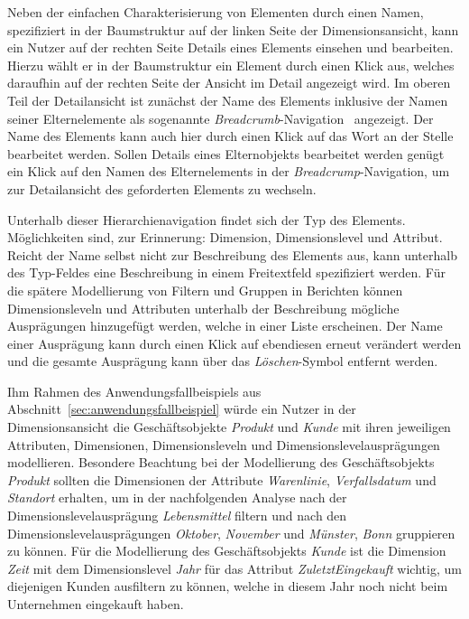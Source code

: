 \documentclass[
  language=german, %
  type=bachelor,%
  ngerman
]{isthesis}
\begin{document}
\begin{content}
  Neben der einfachen Charakterisierung von Elementen durch einen Namen,
  spezifiziert in der Baumstruktur auf der linken Seite der Dimensionsansicht,
  kann ein Nutzer auf der rechten Seite Details eines Elements einsehen und
  bearbeiten.  Hierzu wählt er in der Baumstruktur ein Element durch einen
  Klick aus, welches daraufhin auf der rechten Seite der Ansicht im Detail
  angezeigt wird. Im oberen Teil der Detailansicht ist zunächst der Name des
  Elements inklusive der Namen seiner Elternelemente als sogenannte
  \textit{Breadcrumb}-Navigation~\cite[][S. 1316]{maldonado2002common}
  angezeigt.  Der Name des Elements kann auch hier durch einen Klick auf das
  Wort an der Stelle bearbeitet werden. Sollen Details eines Elternobjekts
  bearbeitet werden genügt ein Klick auf den Namen des Elternelements in der
  \textit{Breadcrump}-Navigation, um zur Detailansicht des geforderten Elements
  zu wechseln. 

  Unterhalb dieser Hierarchienavigation findet sich der Typ des Elements.
  Möglichkeiten sind, zur Erinnerung: Dimension, Dimensionslevel und Attribut.
  Reicht der Name selbst nicht zur Beschreibung des Elements aus, kann
  unterhalb des Typ-Feldes eine Beschreibung in einem Freitextfeld spezifiziert
  werden. Für die spätere Modellierung von Filtern und Gruppen in Berichten
  können Dimensionsleveln und Attributen unterhalb der Beschreibung mögliche
  Ausprägungen hinzugefügt werden, welche in einer Liste erscheinen. Der Name
  einer Ausprägung kann durch einen Klick auf ebendiesen erneut verändert
  werden und die gesamte Ausprägung kann über das
  \textit{Löschen}-Symbol entfernt werden.

  Ihm Rahmen des Anwendungsfallbeispiels aus
  Abschnitt~\ref{sec:anwendungsfallbeispiel} würde ein Nutzer in der
  Dimensionsansicht die Geschäftsobjekte \textit{Produkt} und \textit{Kunde}
  mit ihren jeweiligen Attributen, Dimensionen, Dimensionsleveln und
  Dimensionslevelausprägungen modellieren. Besondere Beachtung bei der
  Modellierung des Geschäftsobjekts \textit{Produkt} sollten die Dimensionen
  der Attribute \textit{Warenlinie}, \textit{Verfallsdatum} und
  \textit{Standort} erhalten, um in der nachfolgenden Analyse nach der
  Dimensionslevelausprägung \textit{Lebensmittel} filtern und nach den
  Dimensionslevelausprägungen \textit{Oktober}, \textit{November} und
  \textit{Münster}, \textit{Bonn} gruppieren zu können. Für die Modellierung
  des Geschäftsobjekts \textit{Kunde} ist die Dimension \textit{Zeit} mit dem
  Dimensionslevel \textit{Jahr} für das Attribut \textit{ZuletztEingekauft}
  wichtig, um diejenigen Kunden ausfiltern zu können, welche in diesem Jahr
  noch nicht beim Unternehmen eingekauft haben.



\end{content}
\end{document}
